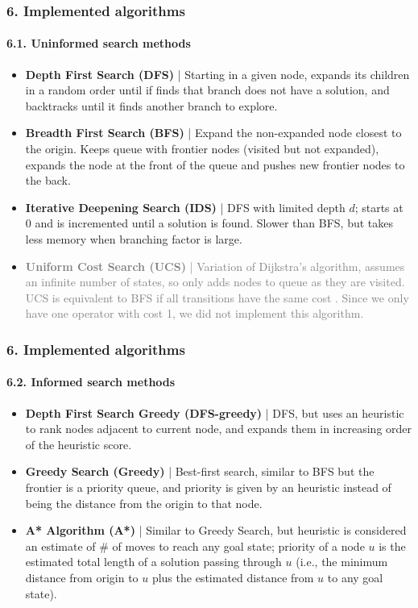 \documentclass{beamer}
\begin{document}
\begin{frame}
\frametitle{6. Implemented algorithms}
\framesubtitle{6.1. Uninformed search methods}

\begin{itemize}
  \item \textbf{Depth First Search (DFS)} | Starting in a given node, expands its children in a random order until if finds that branch does not have a solution, and backtracks until it finds another branch to explore. 
  
  \item \textbf{Breadth First Search (BFS)} |  Expand the non-expanded node closest to the origin. Keeps queue with frontier nodes (visited but not expanded), expands the node at the front of the queue and pushes new frontier nodes to the back.
  
  \item \textbf{Iterative Deepening Search (IDS)} | DFS with limited depth $d$; starts at $0$ and is incremented until a solution is found. Slower than BFS, but takes less memory when branching factor is large.
  
  \item \textcolor{gray}{\textbf{Uniform Cost Search (UCS)} | Variation of Dijkstra's algorithm, assumes an infinite number of states, so only adds nodes to queue as they are visited.
  UCS is equivalent to BFS if all transitions have the same cost \cite{javatpoint-uninformed}.
  Since we only have one operator with cost 1, we did not implement this algorithm.}
\end{itemize}
\end{frame}

\begin{frame}
\frametitle{6. Implemented algorithms}
\framesubtitle{6.2. Informed search methods}

\begin{itemize}  
  \item \textbf{Depth First Search Greedy (DFS-greedy)} | DFS, but uses an heuristic to rank nodes adjacent to current node, and expands them in increasing order of the heuristic score.
  \item \textbf{Greedy Search (Greedy)} | Best-first search, similar to BFS but the frontier is a priority queue, and priority is given by an heuristic instead of being the distance from the origin to that node.
  \item \textbf{A* Algorithm (A*)} | Similar to Greedy Search, but heuristic is considered an estimate of \# of moves to reach any goal state; priority of a node $u$ is the estimated total length of a solution passing through $u$ (i.e., the minimum distance from origin to $u$ plus the estimated distance from $u$ to any goal state).
\end{itemize}
\end{frame}
\end{document}
